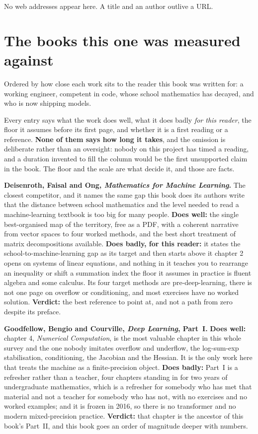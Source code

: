 No web addresses appear here. A title and an author outlive a URL.

\section{The books this one was measured against}
\label{sec:E-survey}

Ordered by how close each work sits to the reader this book was written for: a
working engineer, competent in code, whose school mathematics has decayed, and
who is now shipping models.

Every entry says what the work does well, what it does badly \emph{for this
reader}, the floor it assumes before its first page, and whether it is a first
reading or a reference. \textbf{None of them says how long it takes}, and the
omission is deliberate rather than an oversight: nobody on this project has
timed a reading, and a duration invented to fill the column would be the first
unsupported claim in the book. The floor and the scale are what decide it, and
those are facts.

\medskip
\textbf{Deisenroth, Faisal and Ong, \emph{Mathematics for Machine Learning}.}
The closest competitor, and it names the same gap this book does \dash{} its
authors write that the distance between school mathematics and the level needed
to read a machine-learning textbook is too big for many people. \textbf{Does well:}
the single best-organised map of the territory, free as a PDF, with a coherent
narrative from vector spaces to four worked methods, and the best short
treatment of matrix decompositions available. \textbf{Does badly, for this
reader:} it states the school-to-machine-learning gap as its target and then
starts above it \dash{} chapter 2 opens on systems of linear equations, and
nothing in it teaches you to rearrange an inequality or shift a summation
index \dash{} the floor it assumes in practice is fluent algebra and some
calculus. Its four target methods are pre-deep-learning, there is not one page
on overflow or conditioning, and most exercises have no worked solution.
\textbf{Verdict:} the best reference to point at, and not a path from zero
despite its preface.

\medskip
\textbf{Goodfellow, Bengio and Courville, \emph{Deep Learning}, Part~I.}
\textbf{Does well:} chapter 4, \emph{Numerical Computation}, is the most
valuable chapter in this whole survey and the one nobody imitates
\dash{} overflow and underflow, the log-sum-exp stabilisation, conditioning,
the Jacobian and the Hessian. It is the only work here that treats the machine
as a finite-precision object. \textbf{Does badly:} Part~I is a refresher rather
than a teacher, four chapters standing in for two years of undergraduate
mathematics, which is a refresher for somebody who has met that material and
not a teacher for somebody who has not, with no exercises and no worked
examples; and it is frozen in
2016, so there is no transformer and no modern mixed-precision practice.
\textbf{Verdict:} that chapter is the ancestor of this book's Part~II, and this
book goes an order of magnitude deeper with numbers.

